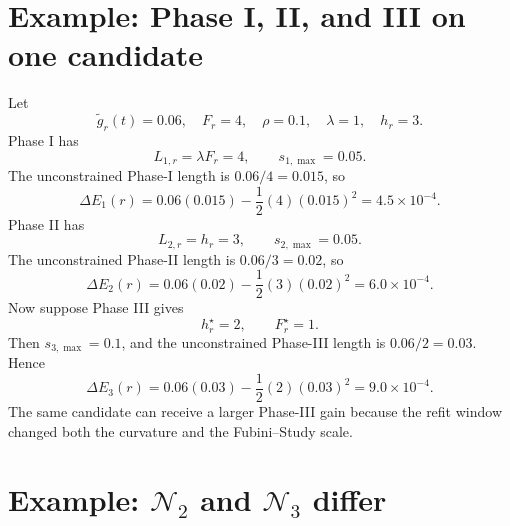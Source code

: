 \documentclass[10pt,twocolumn]{article}
\begin{document}
\section{Example: Phase I, II, and III on one candidate}

Let
\begin{equation}
\widetilde g_r(t)=0.06,\quad
F_r=4,\quad
\rho=0.1,\quad
\lambda=1,\quad
h_r=3.
\label{eq:phase_compare_data}
\end{equation}
Phase I has
\begin{equation}
L_{1,r}=\lambda F_r=4,
\qquad
s_{1,\max}=0.05.
\label{eq:phase_compare_p1}
\end{equation}
The unconstrained Phase-I length is \(0.06/4=0.015\), so
\begin{equation}
\Delta E_1(r)=0.06(0.015)-\frac12(4)(0.015)^2
=4.5\times10^{-4}.
\label{eq:phase_compare_d1}
\end{equation}
Phase II has
\begin{equation}
L_{2,r}=h_r=3,
\qquad
s_{2,\max}=0.05.
\label{eq:phase_compare_p2}
\end{equation}
The unconstrained Phase-II length is \(0.06/3=0.02\), so
\begin{equation}
\Delta E_2(r)=0.06(0.02)-\frac12(3)(0.02)^2
=6.0\times10^{-4}.
\label{eq:phase_compare_d2}
\end{equation}
Now suppose Phase III gives
\begin{equation}
h_r^\star=2,\qquad
F_r^\star=1.
\label{eq:phase_compare_p3_data}
\end{equation}
Then \(s_{3,\max}=0.1\), and the unconstrained Phase-III length is \(0.06/2=0.03\). Hence
\begin{equation}
\Delta E_3(r)=0.06(0.03)-\frac12(2)(0.03)^2
=9.0\times10^{-4}.
\label{eq:phase_compare_d3}
\end{equation}
The same candidate can receive a larger Phase-III gain because the refit window changed both the curvature and the Fubini--Study scale.

\section{Example: \(\mathcal N_2\) and \(\mathcal N_3\) differ}
\end{document}
